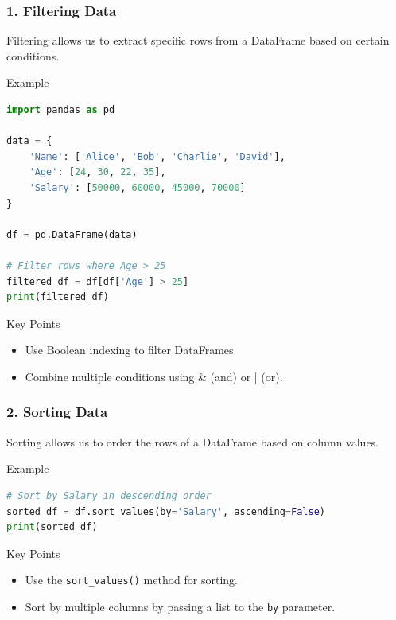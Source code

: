 \documentclass{beamer}
\begin{document}
\begin{frame}[fragile]
    \frametitle{1. Filtering Data}
    Filtering allows us to extract specific rows from a DataFrame based on certain conditions.
    
    \begin{block}{Example}
        \begin{lstlisting}[language=Python]
import pandas as pd

data = {
    'Name': ['Alice', 'Bob', 'Charlie', 'David'],
    'Age': [24, 30, 22, 35],
    'Salary': [50000, 60000, 45000, 70000]
}

df = pd.DataFrame(data)

# Filter rows where Age > 25
filtered_df = df[df['Age'] > 25]
print(filtered_df)
        \end{lstlisting}
    \end{block}
    
    \begin{block}{Key Points}
        \begin{itemize}
            \item Use Boolean indexing to filter DataFrames.
            \item Combine multiple conditions using \& (and) or | (or).
        \end{itemize}
    \end{block}
\end{frame}

\begin{frame}[fragile]
    \frametitle{2. Sorting Data}
    Sorting allows us to order the rows of a DataFrame based on column values.

    \begin{block}{Example}
        \begin{lstlisting}[language=Python]
# Sort by Salary in descending order
sorted_df = df.sort_values(by='Salary', ascending=False)
print(sorted_df)
        \end{lstlisting}
    \end{block}

    \begin{block}{Key Points}
        \begin{itemize}
            \item Use the \texttt{sort\_values()} method for sorting.
            \item Sort by multiple columns by passing a list to the \texttt{by} parameter.
        \end{itemize}
    \end{block}
\end{frame}
\end{document}

